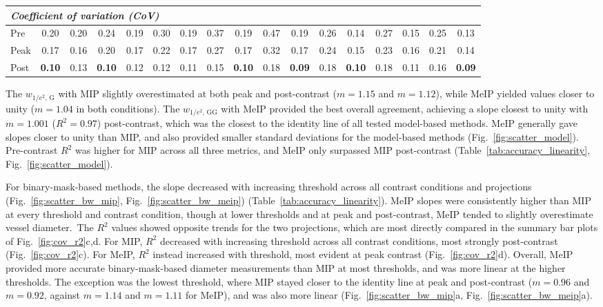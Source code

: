 \documentclass{optica-article}
\begin{document}
\begin{table}[p]
{\begin{tabular}{l c c | c c | c c | c c | c c || c c | c c | c c}
\hline
\multicolumn{17}{l}{\textit{Coefficient of variation (CoV)}} \\
\hline
Pre & 0.20 & 0.20 & 0.24 & 0.19 & 0.30 & 0.19 & 0.37 & 0.19 & 0.47 & 0.19 & 0.26 & 0.14 & 0.27 & 0.15 & 0.25 & 0.13 \\
Peak & 0.17 & 0.16 & 0.20 & 0.17 & 0.22 & 0.17 & 0.27 & 0.17 & 0.32 & 0.17 & 0.24 & 0.15 & 0.23 & 0.16 & 0.21 & 0.14 \\
Post & \textbf{0.10} & 0.13 & \textbf{0.10} & 0.12 & 0.12 & 0.11 & 0.15 & \textbf{0.10} & 0.18 & \textbf{0.09} & 0.18 & \textbf{0.10} & 0.18 & 0.11 & 0.16 & \textbf{0.09} \\
\hline
\end{tabular}%
}
\end{table}

The $w_{1/e^2,\,\mathrm{G}}$ with MIP slightly overestimated at both peak and post-contrast ($m = 1.15$ and $m = 1.12$), while MeIP yielded values closer to unity ($m = 1.04$ in both conditions). The $w_{1/e^2,\,\mathrm{GG}}$ with MeIP provided the best overall agreement, achieving a slope closest to unity with $m = 1.001$ ($R^2 = 0.97$) post-contrast, which was the closest to the identity line of all tested model-based methods. MeIP generally gave slopes closer to unity than MIP, and also provided smaller standard deviations for the model-based methods (Fig.~\ref{fig:scatter_model}). Pre-contrast $R^2$ was higher for MIP across all three metrics, and MeIP only surpassed MIP post-contrast (Table~\ref{tab:accuracy_linearity}, Fig.~\ref{fig:scatter_model}).

For binary-mask-based methods, the slope decreased with increasing threshold across all contrast conditions and projections (Fig.~\ref{fig:scatter_bw_mip}, Fig.~\ref{fig:scatter_bw_meip}) (Table~\ref{tab:accuracy_linearity}). MeIP slopes were consistently higher than MIP at every threshold and contrast condition, though at lower thresholds and at peak and post-contrast, MeIP tended to slightly overestimate vessel diameter.~The $R^2$ values showed opposite trends for the two projections, which are most directly compared in the summary bar plots of Fig.~\ref{fig:cov_r2}c,d. For MIP, $R^2$ decreased with increasing threshold across all contrast conditions, most strongly post-contrast (Fig.~\ref{fig:cov_r2}c). For MeIP, $R^2$ instead increased with threshold, most evident at peak contrast (Fig.~\ref{fig:cov_r2}d). Overall, MeIP provided more accurate binary-mask-based diameter measurements than MIP at most thresholds, and was more linear at the higher thresholds. The exception was the lowest threshold, where MIP stayed closer to the identity line at peak and post-contrast ($m = 0.96$ and $m = 0.92$, against $m = 1.14$ and $m = 1.11$ for MeIP), and was also more linear (Fig.~\ref{fig:scatter_bw_mip}a, Fig.~\ref{fig:scatter_bw_meip}a).
\end{document}
